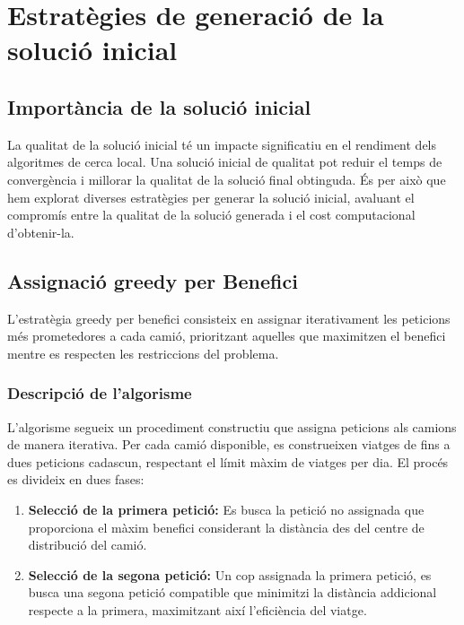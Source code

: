 \section{Estratègies de generació de la solució inicial}
\label{sec:initial}

\vspace{0.5cm}

\subsection{Importància de la solució inicial}

La qualitat de la solució inicial té un impacte significatiu en el rendiment dels algoritmes de cerca local. Una solució inicial de qualitat pot reduir el temps de convergència i millorar la qualitat de la solució final obtinguda. És per això que hem explorat diverses estratègies per generar la solució inicial, avaluant el compromís entre la qualitat de la solució generada i el cost computacional d'obtenir-la.

\vspace{0.5cm}

\subsection{Assignació greedy per Benefici}

L'estratègia greedy per benefici consisteix en assignar iterativament les peticions més prometedores a cada camió, prioritzant aquelles que maximitzen el benefici mentre es respecten les restriccions del problema.

\vspace{0.5cm}

\subsubsection{Descripció de l'algorisme}

L'algorisme segueix un procediment constructiu que assigna peticions als camions de manera iterativa. Per cada camió disponible, es construeixen viatges de fins a dues peticions cadascun, respectant el límit màxim de viatges per dia. El procés es divideix en dues fases:

\begin{enumerate}
    \item \textbf{Selecció de la primera petició:} Es busca la petició no assignada que proporciona el màxim benefici considerant la distància des del centre de distribució del camió.
    
    \item \textbf{Selecció de la segona petició:} Un cop assignada la primera petició, es busca una segona petició compatible que minimitzi la distància addicional respecte a la primera, maximitzant així l'eficiència del viatge.
\end{enumerate}

